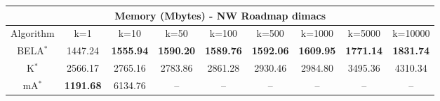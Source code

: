 \begin{tabular}{c|cccccccc}\toprule
\multicolumn{9}{c}{Memory (Mbytes) - NW Roadmap dimacs}\\ \midrule
Algorithm & k=1 & k=10 & k=50 & k=100 & k=500 & k=1000 & k=5000 & k=10000 \\ \midrule
BELA$^*$ & 1447.24 & \textbf{1555.94} & \textbf{1590.20} & \textbf{1589.76} & \textbf{1592.06} & \textbf{1609.95} & \textbf{1771.14} & \textbf{1831.74} \\
K$^*$ & 2566.17 & 2765.16 & 2783.86 & 2861.28 & 2930.46 & 2984.80 & 3495.36 & 4310.34 \\
mA$^*$ & \textbf{1191.68} & 6134.76 & -- & -- & -- & -- & -- & -- \\ \bottomrule 
\end{tabular}
